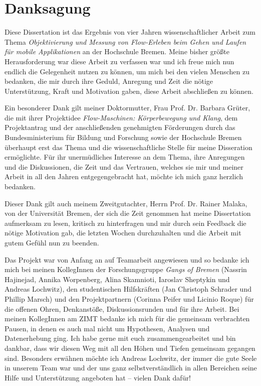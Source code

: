 \section*{Danksagung}

Diese Dissertation ist das Ergebnis von vier Jahren wissenschaftlicher Arbeit zum Thema \emph{Objektivierung und Messung von Flow-Erleben beim Gehen und Laufen für mobile Applikationen} an der Hochschule Bremen. Meine bisher größte Herausforderung war diese Arbeit zu verfassen war  und ich freue mich nun endlich die Gelegenheit nutzen zu können, um mich bei den vielen Menschen zu bedanken, die mir durch ihre Geduld, Anregung und Zeit die nötige Unterstützung, Kraft und Motivation gaben, diese Arbeit abschließen zu können.

Ein besonderer Dank gilt meiner Doktormutter, Frau Prof. Dr. Barbara Grüter, die mit ihrer Projektidee \emph{Flow-Maschinen: Körperbewegung und Klang}, dem Projektantrag und der anschließenden genehmigten Förderungen durch das Bundesministerium für Bildung und Forschung sowie der Hochschule Bremen überhaupt erst das Thema und die wissenschaftliche Stelle für meine Disseration ermöglichte. Für ihr unermüdliches Interesse an dem Thema, ihre Anregungen und die Diskussionen, die Zeit und das Vertrauen, welches sie mir und meiner Arbeit in all den Jahren entgegengebracht hat, möchte ich mich ganz herzlich bedanken.

Dieser Dank gilt auch meinem Zweitgutachter, Herrn Prof. Dr. Rainer Malaka, von der Universität Bremen, der sich die Zeit genommen hat meine Dissertation aufmerksam zu lesen, kritisch zu hinterfragen und mir durch sein Feedback die nötige Motivation gab, die letzten Wochen durchzuhalten und die Arbeit mit gutem Gefühl nun zu beenden.

Das Projekt war von Anfang an auf Teamarbeit angewiesen und so bedanke ich mich bei meinen KollegInnen der Forschungsgruppe \emph{Gangs of Bremen} (Nassrin Hajinejad, Annika Worpenberg, Alina Skamnioti, Iaroslav Sheptykin und Andreas Lochwitz), den studentischen Hilfskräften (Jan Christoph Schrader und Phillip Marsch) und den Projektpartnern (Corinna Peifer und Licinio Roque) für die offenen Ohren, Denkanstöße, Diskussionsrunden und für ihre Arbeit. Bei meinen KollegInnen am ZIMT bedanke ich mich für die gemeinsam verbrachten Pausen, in denen es auch mal nicht um Hypothesen, Analysen und Datenerhebung ging. Ich habe gerne mit euch zusammengearbeitet und bin dankbar, dass wir diesen Weg mit all den Höhen und Tiefen gemeinsam gegangen sind. Besonders erwähnen möchte ich Andreas Lochwitz, der immer die gute Seele in unserem Team war und der uns ganz selbstverständlich in allen Bereichen seine Hilfe und Unterstützung angeboten hat -- vielen Dank dafür! 


